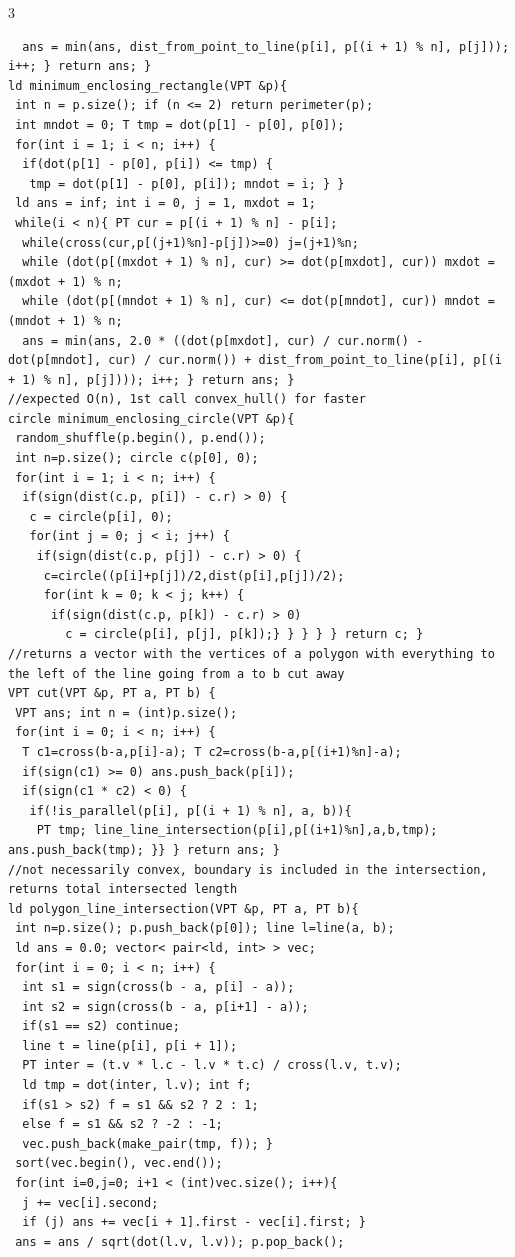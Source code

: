 \documentclass[8pt,a4paper,onesided]{article}
\begin{document}
\begin{multicols}{3}
\begin{verbatim}
  ans = min(ans, dist_from_point_to_line(p[i], p[(i + 1) % n], p[j])); i++; } return ans; }
ld minimum_enclosing_rectangle(VPT &p){
 int n = p.size(); if (n <= 2) return perimeter(p);
 int mndot = 0; T tmp = dot(p[1] - p[0], p[0]);
 for(int i = 1; i < n; i++) {
  if(dot(p[1] - p[0], p[i]) <= tmp) {
   tmp = dot(p[1] - p[0], p[i]); mndot = i; } }
 ld ans = inf; int i = 0, j = 1, mxdot = 1;
 while(i < n){ PT cur = p[(i + 1) % n] - p[i];
  while(cross(cur,p[(j+1)%n]-p[j])>=0) j=(j+1)%n;
  while (dot(p[(mxdot + 1) % n], cur) >= dot(p[mxdot], cur)) mxdot = (mxdot + 1) % n;
  while (dot(p[(mndot + 1) % n], cur) <= dot(p[mndot], cur)) mndot = (mndot + 1) % n;
  ans = min(ans, 2.0 * ((dot(p[mxdot], cur) / cur.norm() - dot(p[mndot], cur) / cur.norm()) + dist_from_point_to_line(p[i], p[(i + 1) % n], p[j]))); i++; } return ans; }
//expected O(n), 1st call convex_hull() for faster
circle minimum_enclosing_circle(VPT &p){
 random_shuffle(p.begin(), p.end());
 int n=p.size(); circle c(p[0], 0);
 for(int i = 1; i < n; i++) {
  if(sign(dist(c.p, p[i]) - c.r) > 0) {
   c = circle(p[i], 0);
   for(int j = 0; j < i; j++) {
    if(sign(dist(c.p, p[j]) - c.r) > 0) {
     c=circle((p[i]+p[j])/2,dist(p[i],p[j])/2);
     for(int k = 0; k < j; k++) {
      if(sign(dist(c.p, p[k]) - c.r) > 0)
        c = circle(p[i], p[j], p[k]);} } } } } return c; }
//returns a vector with the vertices of a polygon with everything to the left of the line going from a to b cut away
VPT cut(VPT &p, PT a, PT b) {
 VPT ans; int n = (int)p.size();
 for(int i = 0; i < n; i++) {
  T c1=cross(b-a,p[i]-a); T c2=cross(b-a,p[(i+1)%n]-a);
  if(sign(c1) >= 0) ans.push_back(p[i]);
  if(sign(c1 * c2) < 0) {
   if(!is_parallel(p[i], p[(i + 1) % n], a, b)){
    PT tmp; line_line_intersection(p[i],p[(i+1)%n],a,b,tmp); ans.push_back(tmp); }} } return ans; }
//not necessarily convex, boundary is included in the intersection, returns total intersected length
ld polygon_line_intersection(VPT &p, PT a, PT b){
 int n=p.size(); p.push_back(p[0]); line l=line(a, b);
 ld ans = 0.0; vector< pair<ld, int> > vec;
 for(int i = 0; i < n; i++) {
  int s1 = sign(cross(b - a, p[i] - a));
  int s2 = sign(cross(b - a, p[i+1] - a));
  if(s1 == s2) continue;
  line t = line(p[i], p[i + 1]);
  PT inter = (t.v * l.c - l.v * t.c) / cross(l.v, t.v);
  ld tmp = dot(inter, l.v); int f;
  if(s1 > s2) f = s1 && s2 ? 2 : 1;
  else f = s1 && s2 ? -2 : -1;
  vec.push_back(make_pair(tmp, f)); }
 sort(vec.begin(), vec.end());
 for(int i=0,j=0; i+1 < (int)vec.size(); i++){
  j += vec[i].second;
  if (j) ans += vec[i + 1].first - vec[i].first; }
 ans = ans / sqrt(dot(l.v, l.v)); p.pop_back();

\end{verbatim}
\end{multicols}
\end{document}

